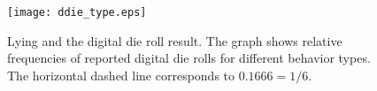 \documentclass[12pt]{article}
\begin{document}
\begin{comment}
\clearpage 
\begin{landscape}
\begin{table}[ht]
\tiny
\begin{center}

\end{center}
\caption{The magnitude of limited cheating, Chile}
\label{table_limit_chile}
\end{table}
\end{landscape}

\clearpage 
\begin{landscape}
\begin{table}[ht]
\tiny
\begin{center}

\end{center}
\caption{The magnitude of limited cheating, Russia}
\label{table_limit_russia}
\end{table}
\end{landscape}

\clearpage
\begin{landscape}
\begin{table}[ht]
\tiny
\begin{center}

\end{center}
\caption{The magnitude of limited cheating, the U.K.}
\label{table_limit_uk}
\end{table}
\end{landscape}

\clearpage
\end{comment}

\begin{figure}[!htb]
\centerline{\texttt{[image: ddie\_type.eps]}}
\caption{Lying and the digital die roll result. The graph shows relative frequencies of reported digital die rolls for different behavior types. The horizontal dashed line corresponds to $0.1666 = 1/6$. }\label{fig:digdietoss}
\end{figure}
\end{document}
